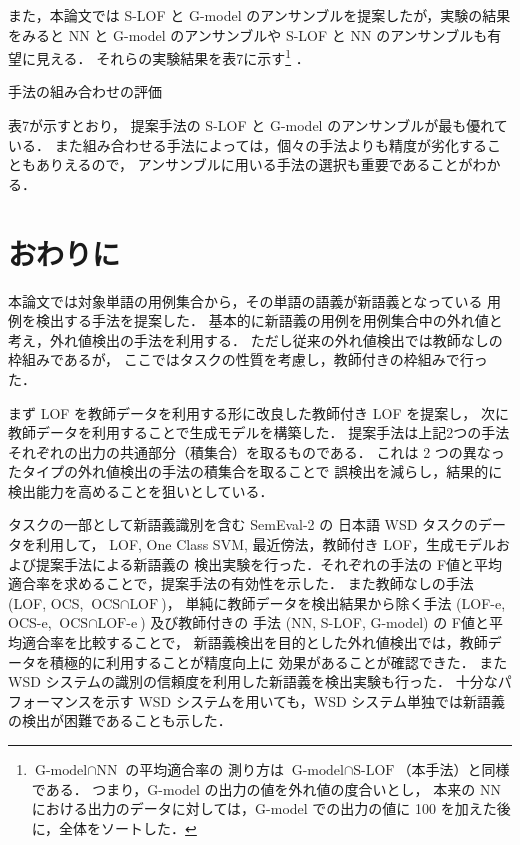 \documentclass[japanese]{jnlp_1.4}
\begin{document}
また，本論文では S-LOF と G-model のアンサンブルを提案したが，実験の結果をみると
NN と G-model のアンサンブルや S-LOF と NN のアンサンブルも有望に見える．
それらの実験結果を表7に示す\footnote{$\text{G-model}\cap\text{NN}$ の平均適合率の
測り方は $\text{G-model}\cap\text{S-LOF}$（本手法）と同様である．
つまり，G-model の出力の値を外れ値の度合いとし，
本来の NN における出力のデータに対しては，G-model での出力の値に 100 を加えた後に，全体をソートした．} ．

\begin{table}[t]
\caption{手法の組み合わせの評価}
\label{tab:nncombi}

\end{table}


表7が示すとおり，
提案手法の S-LOF と G-model のアンサンブルが最も優れている．
また組み合わせる手法によっては，個々の手法よりも精度が劣化することもありえるので，
アンサンブルに用いる手法の選択も重要であることがわかる．


\section{おわりに}

本論文では対象単語の用例集合から，その単語の語義が新語義となっている
用例を検出する手法を提案した．
基本的に新語義の用例を用例集合中の外れ値と考え，外れ値検出の手法を利用する．
ただし従来の外れ値検出では教師なしの枠組みであるが，
ここではタスクの性質を考慮し，教師付きの枠組みで行った．

まず LOF を教師データを利用する形に改良した教師付き LOF を提案し，
次に教師データを利用することで生成モデルを構築した．
提案手法は上記2つの手法それぞれの出力の共通部分（積集合）を取るものである．
これは 2 つの異なったタイプの外れ値検出の手法の積集合を取ることで
誤検出を減らし，結果的に検出能力を高めることを狙いとしている．

タスクの一部として新語義識別を含む SemEval-2 の 日本語 WSD タスクのデータを利用して，
LOF, One Class SVM, 最近傍法，教師付き LOF，生成モデルおよび提案手法による新語義の
検出実験を行った．それぞれの手法の F値と平均適合率を求めることで，提案手法の有効性を示した．
また教師なしの手法 (LOF, OCS, $\text{OCS}\cap\text{LOF}$)，
単純に教師データを検出結果から除く手法 (LOF-e, OCS-e, $\text{OCS}\cap\text{LOF-e}$) 及び教師付きの
手法 (NN, S-LOF, G-model) の F値と平均適合率を比較することで，
新語義検出を目的とした外れ値検出では，教師データを積極的に利用することが精度向上に
効果があることが確認できた．
また WSD システムの識別の信頼度を利用した新語義を検出実験も行った．
十分なパフォーマンスを示す WSD システムを用いても，WSD システム単独では新語義の検出が困難であることも示した．
\end{document}
